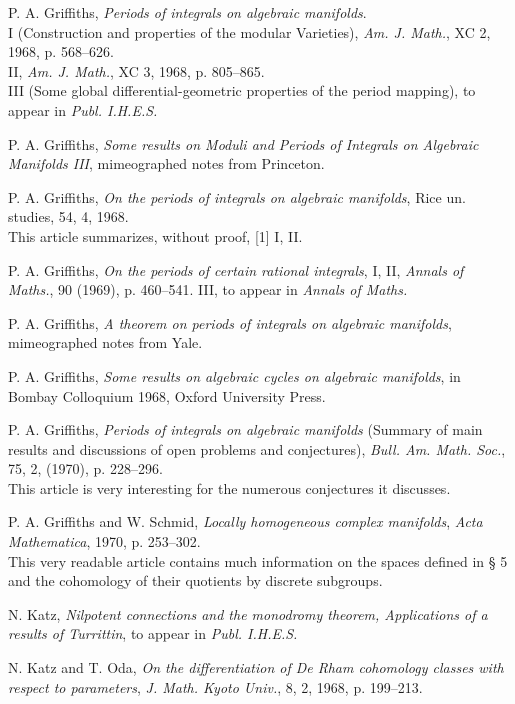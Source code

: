 \documentclass[10pt]{article}
\theoremstyle{deligne}
\begin{document}
\begin{enumerate}[label={[\arabic*]},leftmargin=2.8em]
\item P. A. Griffiths, \emph{Periods of integrals on algebraic manifolds}.\\
I (Construction and properties of the modular Varieties), \emph{Am. J. Math.}, XC 2, 1968, p. 568--626.\\
II, \emph{Am. J. Math.}, XC 3, 1968, p. 805--865.\\
III (Some global differential-geometric properties of the period mapping), to appear in \emph{Publ. I.H.E.S.}

\item P. A. Griffiths, \emph{Some results on Moduli and Periods of Integrals on Algebraic Manifolds III}, mimeographed notes from Princeton.

\item P. A. Griffiths, \emph{On the periods of integrals on algebraic manifolds}, Rice un. studies, 54, 4, 1968.\\
This article summarizes, without proof, [1] I, II.

\item P. A. Griffiths, \emph{On the periods of certain rational integrals}, I, II, \emph{Annals of Maths.}, 90 (1969), p. 460--541. III, to appear in \emph{Annals of Maths.}

\item P. A. Griffiths, \emph{A theorem on periods of integrals on algebraic manifolds}, mimeographed notes from Yale.

\item P. A. Griffiths, \emph{Some results on algebraic cycles on algebraic manifolds}, in Bombay Colloquium 1968, Oxford University Press.

\item P. A. Griffiths, \emph{Periods of integrals on algebraic manifolds} (Summary of main results and discussions of open problems and conjectures), \emph{Bull. Am. Math. Soc.}, 75, 2, (1970), p. 228--296.\\
This article is very interesting for the numerous conjectures it discusses.

\item P. A. Griffiths and W. Schmid, \emph{Locally homogeneous complex manifolds}, \emph{Acta Mathematica}, 1970, p. 253--302.\\
This very readable article contains much information on the spaces defined in § 5 and the cohomology of their quotients by discrete subgroups.

\item N. Katz, \emph{Nilpotent connections and the monodromy theorem, Applications of a results of Turrittin}, to appear in \emph{Publ. I.H.E.S.}

\item N. Katz and T. Oda, \emph{On the differentiation of De Rham cohomology classes with respect to parameters}, \emph{J. Math. Kyoto Univ.}, 8, 2, 1968, p. 199--213.
\end{enumerate}
\end{document}

